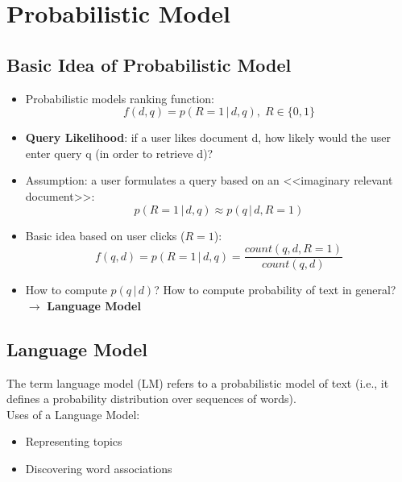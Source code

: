\newpage
\section{Probabilistic Model}

\subsection{Basic Idea of Probabilistic Model}

\begin{itemize}
\item Probabilistic models ranking function: 
\begin{equation*}
f(d, q) = p(R=1 \,\big|\, d,q), \; R \in \{0,1\}
\end{equation*}
\item \textbf{Query Likelihood}: if a user likes document d, how likely would the user enter query q (in order to retrieve d)? 
\item Assumption: a user formulates a query based on an <<imaginary relevant document>>:
\begin{equation*}
p(R=1 \,\big|\, d,q) \approx p(q \,\big|\, d,R=1)
\end{equation*}
\item Basic idea based on user clicks ($R=1$):
\begin{equation*}
f(q, d) = p(R=1 \,\big|\, d,q) = \frac{count(q, d, R=1)}{count(q,d)}
\end{equation*}
\item How to compute $p(q \,|\, d)$? How to compute probability of
text in general? $\to$ \textbf{Language Model}
\end{itemize}


\subsection{Language Model}
The term language model (LM) refers to a probabilistic model of text (i.e., it defines a probability distribution over sequences of words).\\

Uses of a Language Model:
\begin{itemize}
\item Representing topics
\item Discovering word associations
\end{itemize}



